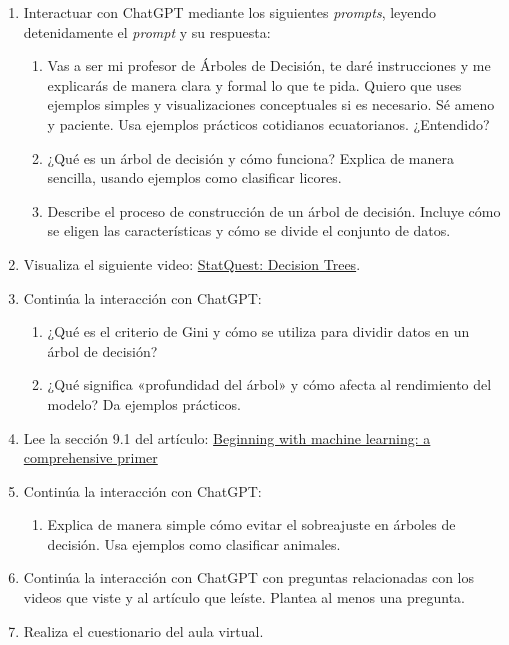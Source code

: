 \documentclass[a4,11pt]{aleph-notas}
\begin{document}
\begin{enumerate}[leftmargin=*]
    \item Interactuar con ChatGPT mediante los siguientes \textit{prompts}, leyendo detenidamente el \textit{prompt} y su respuesta:
    \begin{enumerate}[label=\textit{Prompt \arabic*.},leftmargin=2.1cm]
        \item Vas a ser mi profesor de Árboles de Decisión, te daré instrucciones y me explicarás de manera clara y formal lo que te pida. Quiero que uses ejemplos simples y visualizaciones conceptuales si es necesario. Sé ameno y paciente. Usa ejemplos prácticos cotidianos ecuatorianos. ¿Entendido?
        \item ¿Qué es un árbol de decisión y cómo funciona? Explica de manera sencilla, usando ejemplos como clasificar licores.
        \item Describe el proceso de construcción de un árbol de decisión. Incluye cómo se eligen las características y cómo se divide el conjunto de datos.
    \end{enumerate}
    \item Visualiza el siguiente video: \href{https://youtu.be/7VeUPuFGJHk?si=LQzPfVSBrvLKbHAM}{StatQuest: Decision Trees}.
    \item Continúa la interacción con ChatGPT:
    \begin{enumerate}[label=\textit{Prompt \arabic*.},leftmargin=2.1cm, start=4]
        \item ¿Qué es el criterio de Gini y cómo se utiliza para dividir datos en un árbol de decisión?
        \item ¿Qué significa «profundidad del árbol» y cómo afecta al rendimiento del modelo? Da ejemplos prácticos.
    \end{enumerate}
    \item Lee la sección 9.1 del artículo: \href{https://link.springer.com/article/10.1140/epjs/s11734-021-00209-7}{Beginning with machine learning: a comprehensive primer}
    \item Continúa la interacción con ChatGPT:
    \begin{enumerate}[label=\textit{Prompt \arabic*.},leftmargin=2.1cm, start=6]
        \item Explica de manera simple cómo evitar el sobreajuste en árboles de decisión. Usa ejemplos como clasificar animales.
    \end{enumerate}
    \item Continúa la interacción con ChatGPT con preguntas relacionadas con los videos que viste y al artículo que leíste. Plantea al menos una pregunta.
    \item Realiza el cuestionario del aula virtual.
\end{enumerate}
\end{document}
